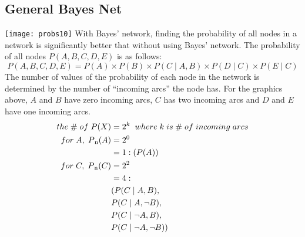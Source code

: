 \documentclass[12pt]{article}
\begin{document}
\subsection*{General Bayes Net}
\texttt{[image: probs10]}
With Bayes' network, finding the probability of all nodes in a network is significantly better that without using Bayes' network. The probability of all nodes \(P(A, B, C, D, E)\) is as follows:
\begin{equation}
P(A, B, C, D, E) = P(A) \times P(B) \times P(C \mid A,B) \times P(D \mid C) \times P(E \mid C)
\end{equation}
The number of values of the probability of each node in the network is determined by the number of \enquote{incoming arcs} the node has. For the graphics above, \(A\) and \(B\) have zero incoming arcs, \(C\) has two incoming arcs and \(D\) and \(E\) have one incoming arcs.\\
\begin{align*}
the\;\#\;of\;P(X) &= 2^{k}\;\;where\;k\;is\;\#\;of\;incoming\;arcs\\
for\;A,\;P\textsubscript{n}(A) &= 2^{0}\\
&= 1 : ( P(A) )\\
for\;C,\;P\textsubscript{n}(C) &= 2^{2}\\
&= 4 : \\
& ( P(C \mid A, B),\\
& P(C \mid A, \neg B),\\
& P(C \mid \neg A, B),\\
& P(C \mid \neg A, \neg B) )\\
\end{align*}
\end{document}
